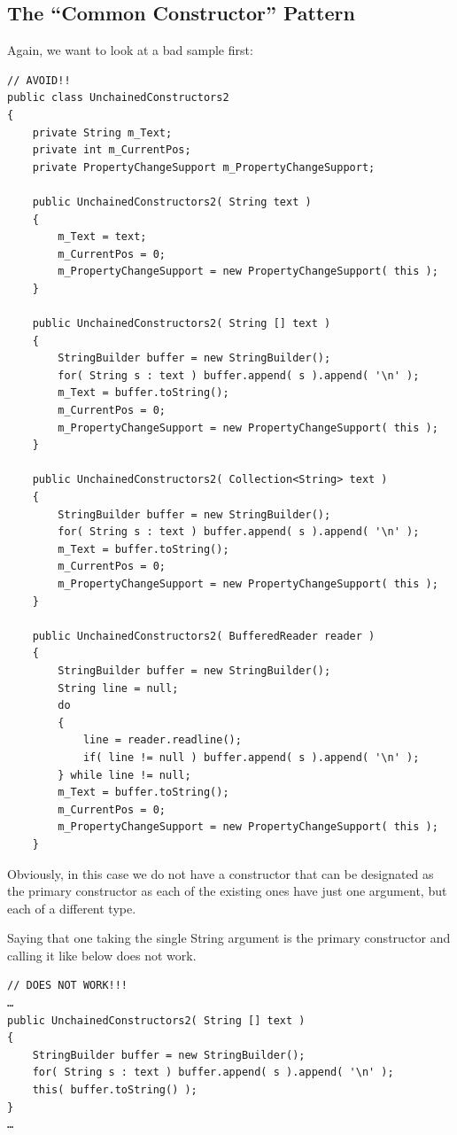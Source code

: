 
\subsection{The “Common Constructor” Pattern}
Again, we want to look at a bad sample first:
\begin{lstlisting}
// AVOID!!
public class UnchainedConstructors2
{
    private String m_Text;
    private int m_CurrentPos;
    private PropertyChangeSupport m_PropertyChangeSupport;
    
    public UnchainedConstructors2( String text )
    {
        m_Text = text;
        m_CurrentPos = 0;
        m_PropertyChangeSupport = new PropertyChangeSupport( this );
    }

    public UnchainedConstructors2( String [] text )
    {
        StringBuilder buffer = new StringBuilder();
        for( String s : text ) buffer.append( s ).append( '\n' );
        m_Text = buffer.toString();
        m_CurrentPos = 0;
        m_PropertyChangeSupport = new PropertyChangeSupport( this );
    }

    public UnchainedConstructors2( Collection<String> text )
    {
        StringBuilder buffer = new StringBuilder();
        for( String s : text ) buffer.append( s ).append( '\n' );
        m_Text = buffer.toString();
        m_CurrentPos = 0;
        m_PropertyChangeSupport = new PropertyChangeSupport( this );
    }

    public UnchainedConstructors2( BufferedReader reader )
    {
        StringBuilder buffer = new StringBuilder();
        String line = null;
        do
        {
            line = reader.readline();
            if( line != null ) buffer.append( s ).append( '\n' );
        } while line != null;
        m_Text = buffer.toString();
        m_CurrentPos = 0;
        m_PropertyChangeSupport = new PropertyChangeSupport( this );
    }
\end{lstlisting}

Obviously, in this case we do not have a constructor that can be designated as the primary constructor as each of the existing ones have just one argument, but each of a different type.

Saying that one taking the single String argument is the primary constructor and calling it like below does not work.
\begin{lstlisting}
// DOES NOT WORK!!!
…
public UnchainedConstructors2( String [] text )
{
    StringBuilder buffer = new StringBuilder();
    for( String s : text ) buffer.append( s ).append( '\n' );
    this( buffer.toString() );
}
…
\end{lstlisting}

